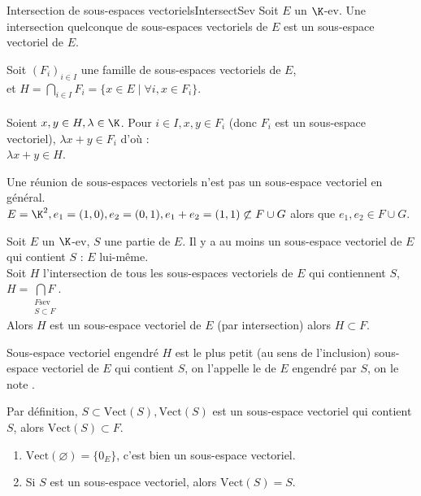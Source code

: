\documentclass[12pt, a4paper]{report}
\begin{document}
\begin{theoreme}{Intersection de sous-espaces vectoriels}{IntersectSev}
Soit $E$ un $\K$-ev. Une intersection quelconque de sous-espaces vectoriels de $E$ est un sous-espace vectoriel de $E$.
\end{theoreme}

\begin{demo}{}
Soit $(F_i)_{i \in I}$ une famille de sous-espaces vectoriels de $E$, \\
et $H = \displaystyle {\underset{i \in I}{\bigcap} F_i} = \{ x \in E \mid \forall i, x \in F_i \}$. \\ \\
Soient $x,y \in H, \lambda \in \K$. Pour $i \in I, x,y \in F_i$ (donc $F_i$ est un sous-espace vectoriel), $\lambda x + y \in F_i$ d'où : \\
$\lambda x + y \in H$.
\end{demo}

\begin{remarque}
Une réunion de sous-espaces vectoriels n'est pas un sous-espace vectoriel en général. \\
$E = \K^2, e_1 = (1,0), e_2 = (0,1), e_1+e_2 = (1,1) \not \subset F \cup G$ alors que $e_1, e_2 \in F \cup G$.
\end{remarque}

\begin{remarque}{}
Soit $E$ un $\K$-ev, $S$ une partie de $E$. Il y a au moins un sous-espace vectoriel de $E$ qui contient $S$ : $E$ lui-même. \\
Soit $H$ l'intersection de tous les sous-espaces vectoriels de $E$ qui contiennent $S$, \\
$H = \displaystyle{\underset{\substack{F \text{sev} \\ S \subset F}}{\bigcap F}}$. \\
Alors $H$ est un sous-espace vectoriel de $E$ (par intersection) alors $H \subset F$. \\

\begin{definition}{Sous-espace vectoriel engendré}{}
$H$ est le plus petit (au sens de l'inclusion) sous-espace vectoriel de $E$ qui contient $S$, on l'appelle le  de $E$ engendré par $S$, on le note .
\end{definition}

Par définition, $S \subset \text{Vect}(S), \text{Vect}(S)$ est un sous-espace vectoriel qui contient $S$, alors $\text{Vect}(S) \subset F$.

\begin{exemple}[Exemples]
\begin{enumerate}
	\item $\text{Vect}(\varnothing) = \{ 0_E \}$, c'est bien un sous-espace vectoriel.
	\item Si $S$ est un sous-espace vectoriel, alors $\text{Vect}(S) = S$.
\end{enumerate}
\end{exemple}

\end{remarque}
\end{document}
